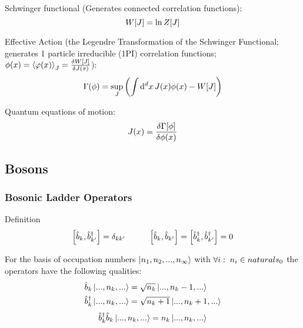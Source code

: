 			\noindent
			Schwinger functional (Generates connected correlation functions):
			\begin{equation}
				W\qty[J] = \ln Z\qty[J]
			\end{equation}

			\noindent
			Effective Action (\ie the Legendre Transformation of the Schwinger Functional; generates 1 particle irreducible (1PI) correlation functions; $\phi(x) = \Avg{\varphi(x)}_J = \fdv{W\qty[J]}{J(x)}$):
			\begin{equation}
				\Gamma(\phi) = \sup_{J} \qty( \int \dd^d x \, J(x) \phi(x) - W[J])
			\end{equation}

			Quantum equations of motion:
			\begin{equation}
				J(x)=\fdv{\Gamma\qty[\phi]}{\phi(x)}
			\end{equation}

	\subsection{Bosons}
		\subsubsection{Bosonic Ladder Operators}
			\label{Sec:BosonicCreationAndAnnihilationOperators}
			Definition
			\begin{equation}
				\comm{\hat{b}_k}{\hat{b}_{k'}^\dagger} = \delta_{kk'}
				\hsp
				\comm{\hat{b}_k}{\hat{b}_{k'}} = \comm{\hat{b}_k^\dagger}{\hat{b}_{k'}^\dagger} = 0
			\end{equation}

			\noindent
			For the basis of occupation numbers $\Ket{n_1, n_2, ..., n_\infty}$ with $\forall i:\;n_i\in \\naturals _0$ the operators have the following qualities:
			\begin{equation}
				\begin{aligned}
					\hat{b}_k \Ket{...,n_k,...} &= \sqrt{n_k} \Ket{...,n_k-1,...} \\
					\hat{b}_k^\dagger \Ket{...,n_k,...} &= \sqrt{n_k+1} \Ket{...,n_k+1,...} \\
				\end{aligned}
			\end{equation}
			\begin{equation}
				\hat{b}_k^\dagger \hat{b}_k \Ket{...,n_k,...} = n_k \Ket{...,n_k,...}
			\end{equation}

